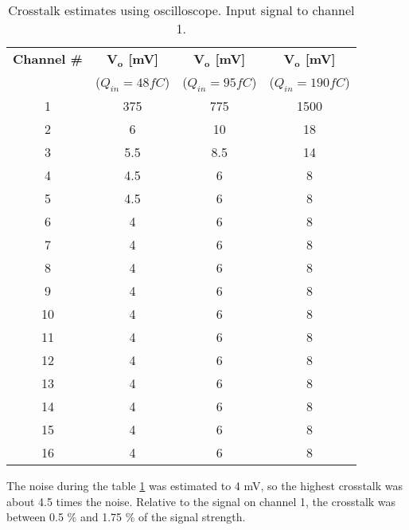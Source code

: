 \documentclass[../main/thesis.tex]{subfiles}
\begin{document}
\begin{table}[h!]
	\begin{center}
		\caption{Crosstalk estimates using oscilloscope. Input signal to channel 1.}
		\label{tab-crosstalk-osc}
		\begin{tabular}{cccc} \toprule
			\textbf{Channel \#} & \textbf{$\mathbf{V_o}$ [mV]} & \textbf{$\mathbf{V_o}$ [mV]} & \textbf{$\mathbf{V_o}$ [mV]} \\
			     & ($Q_{in}=48 fC$) & ($Q_{in}=95 fC$) & ($Q_{in}=190 fC$) \\ \midrule
			1    & 375     & 775      & 1500     \\
			2    & 6    & 10       & 18    \\
			3    & 5.5    & 8.5      & 14    \\
			4    & 4.5    & 6        & 8     \\
			5    & 4.5    & 6        & 8     \\
			6    & 4    & 6        & 8     \\
			7    & 4    & 6        & 8     \\
			8    & 4    & 6        & 8     \\
			9    & 4    & 6        & 8     \\
			10   & 4    & 6        & 8     \\
			11   & 4    & 6        & 8     \\
			12   & 4    & 6        & 8     \\
			13   & 4    & 6        & 8     \\
			14   & 4    & 6        & 8     \\
			15   & 4    & 6        & 8     \\
			16   & 4    & 6        & 8    \\ \bottomrule
		\end{tabular}
	\end{center}
\end{table}

The noise during the table \ref{tab-crosstalk-osc} was estimated to 4 mV, so the highest crosstalk was about 4.5 times the noise. Relative to the signal on channel 1, the crosstalk was between 0.5 \% and 1.75 \% of the signal strength. 
\end{document}
